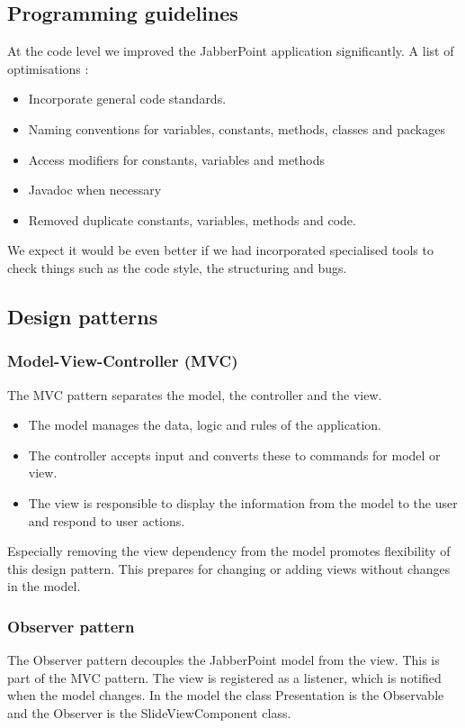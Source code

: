 \documentclass[a4paper]{article}
\begin{document}
\subsection{Programming guidelines}
At the code level we improved the JabberPoint application significantly.
A list of optimisations :
\begin{itemize} 
\item Incorporate general code standards.
\item Naming conventions for variables, constants, methods, classes and packages
\item Access modifiers for constants, variables and methods 
\item Javadoc when necessary
\item Removed duplicate constants, variables, methods and code.
\end{itemize} 
We expect it would be even better if we had incorporated specialised tools to check things such as the code style, the structuring and bugs. 

\subsection{Design patterns}
\subsubsection{Model-View-Controller (MVC)}
The MVC pattern separates the model, the controller and the view.   
\begin{itemize}
\item The model manages the data, logic and rules of the application.
\item The controller accepts input and converts these to commands for model or view.
\item The view is responsible to display the information from the model to the user and respond to user actions.   
\end{itemize}
Especially removing the view dependency from the model promotes flexibility of this design pattern. This prepares for changing or adding views without changes in the model.

\subsubsection{Observer pattern}
The Observer pattern decouples the JabberPoint model from the view. This is part of the MVC pattern. The view is registered as a listener, which is notified when the model changes. In the model the class Presentation is the Observable and the Observer is the SlideViewComponent class.
\end{document}

